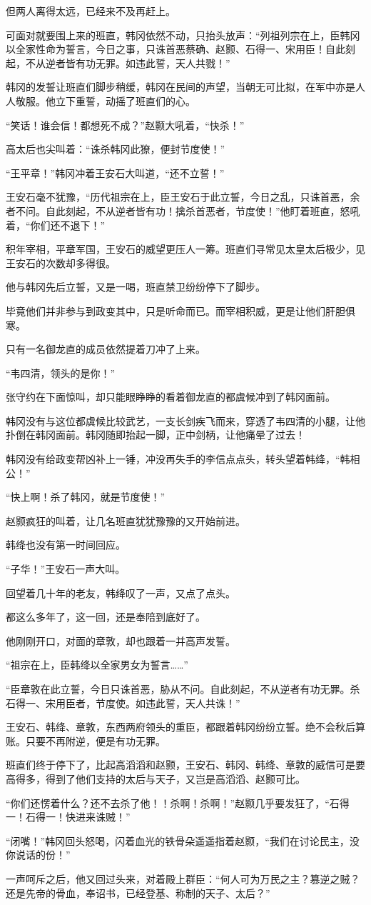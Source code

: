 但两人离得太远，已经来不及再赶上。

可面对就要围上来的班直，韩冈依然不动，只抬头放声：“列祖列宗在上，臣韩冈以全家性命为誓言，今日之事，只诛首恶蔡确、赵颢、石得一、宋用臣！自此刻起，不从逆者皆有功无罪。如违此誓，天人共戮！”

韩冈的发誓让班直们脚步稍缓，韩冈在民间的声望，当朝无可比拟，在军中亦是人人敬服。他立下重誓，动摇了班直们的心。

“笑话！谁会信！都想死不成？”赵颢大吼着，“快杀！”

高太后也尖叫着：“诛杀韩冈此獠，便封节度使！”

“王平章！”韩冈冲着王安石大叫道，“还不立誓！”

王安石毫不犹豫，“历代祖宗在上，臣王安石于此立誓，今日之乱，只诛首恶，余者不问。自此刻起，不从逆者皆有功！擒杀首恶者，节度使！”他盯着班直，怒吼着，“你们还不退下！”

积年宰相，平章军国，王安石的威望更压人一筹。班直们寻常见太皇太后极少，见王安石的次数却多得很。

他与韩冈先后立誓，又是一喝，班直禁卫纷纷停下了脚步。

毕竟他们并非参与到政变其中，只是听命而已。而宰相积威，更是让他们肝胆俱寒。

只有一名御龙直的成员依然提着刀冲了上来。

“韦四清，领头的是你！”

张守约在下面惊叫，却只能眼睁睁的看着御龙直的都虞候冲到了韩冈面前。

韩冈没有与这位都虞候比较武艺，一支长剑疾飞而来，穿透了韦四清的小腿，让他扑倒在韩冈面前。韩冈随即抬起一脚，正中剑柄，让他痛晕了过去！

韩冈没有给政变帮凶补上一锤，冲没再失手的李信点点头，转头望着韩绛，“韩相公！”

“快上啊！杀了韩冈，就是节度使！”

赵颢疯狂的叫着，让几名班直犹犹豫豫的又开始前进。

韩绛也没有第一时间回应。

“子华！”王安石一声大叫。

回望着几十年的老友，韩绛叹了一声，又点了点头。

都这么多年了，这一回，还是奉陪到底好了。

他刚刚开口，对面的章敦，却也跟着一并高声发誓。

“祖宗在上，臣韩绛以全家男女为誓言……”

“臣章敦在此立誓，今日只诛首恶，胁从不问。自此刻起，不从逆者有功无罪。杀石得一、宋用臣者，节度使。如违此誓，天人共诛！”

王安石、韩绛、章敦，东西两府领头的重臣，都跟着韩冈纷纷立誓。绝不会秋后算账。只要不再附逆，便是有功无罪。

班直们终于停下了，比起高滔滔和赵颢，王安石、韩冈、韩绛、章敦的威信可是要高得多，得到了他们支持的太后与天子，又岂是高滔滔、赵颢可比。

“你们还愣着什么？还不去杀了他！！杀啊！杀啊！”赵颢几乎要发狂了，“石得一！石得一！快进来诛贼！”

“闭嘴！”韩冈回头怒喝，闪着血光的铁骨朵遥遥指着赵颢，“我们在讨论民主，没你说话的份！”

一声呵斥之后，他又回过头来，对着殿上群臣：“何人可为万民之主？篡逆之贼？还是先帝的骨血，奉诏书，已经登基、称制的天子、太后？”

